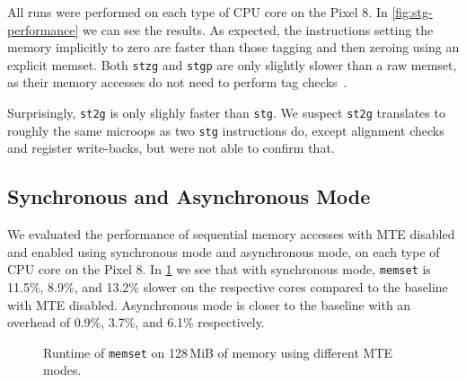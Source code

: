 All runs were performed on each type of CPU core on the Pixel 8.
In \cref{fig:stg-performance} we can see the results.
As expected, the instructions setting the memory implicitly to zero are faster than those tagging and then zeroing using an explicit memset.
Both \texttt{stzg} and \texttt{stgp} are only slightly slower than a raw memset, as their memory accesses do not need to perform tag checks~\cite{ARMA2024Arch64}.

Surprisingly, \texttt{st2g} is only slighly faster than \texttt{stg}.
We suspect \texttt{st2g} translates to roughly the same microops as two \texttt{stg} instructions do, except alignment checks and register write-backs, but were not able to confirm that.

\subsection{Synchronous and Asynchronous Mode}
\label{subsec:synchronous-and-asynchronous-mode}

We evaluated the performance of sequential memory accesses with MTE disabled and enabled using synchronous mode and asynchronous mode, on each type of CPU core on the Pixel 8.
In \cref{fig:sync-async-performance} we see that with synchronous mode, \texttt{memset} is 11.5\%, 8.9\%, and 13.2\% slower on the respective cores compared to the baseline with \ac{MTE} disabled.
Asynchronous mode is closer to the baseline with an overhead of 0.9\%, 3.7\%, and 6.1\% respectively.

\begin{figure}[h]
    \centering
    
    \caption{Runtime of \texttt{memset} on 128\,MiB of memory using different \ac{MTE} modes.}
    \label{fig:sync-async-performance}
\end{figure}
